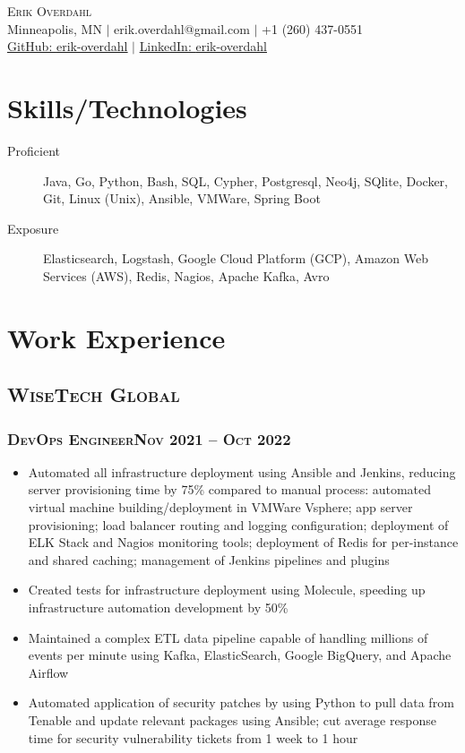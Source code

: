 \documentclass{article}
\newcommand{\resumeSection}[1]{\section*{#1}}
\newcommand{\institution}[1]{\subsection*{\scshape{#1}}}
\newcommand{\jobPosition}[3]{\subsubsection*{\scshape{#1}\hfill #2 -- #3}}
\begin{document}
\begin{center}
  {\Huge\scshape{Erik Overdahl}}
  \\\vspace{5pt}
  \normalsize{
    Minneapolis, MN
    $|$
    erik.overdahl@gmail.com
    $|$
    +1 (260) 437-0551
    \\
    \href{https://github.com/erik-overdahl}{GitHub: \underline{erik-overdahl}}
    $|$
    \href{https://linkedin.com/in/erik-overdahl}{LinkedIn: \underline{erik-overdahl}}
  }
\end{center}

\resumeSection{Skills/Technologies}
  \begin{description}
      \item [Proficient]
          Java,
          Go,
          Python,
          Bash,
          SQL,
          Cypher,
          Postgresql,
          Neo4j,
          SQlite,
          Docker,
          Git,
          Linux (Unix),
          Ansible,
          VMWare,
          Spring Boot

      \item [Exposure]
          Elasticsearch,
          Logstash,
          Google Cloud Platform (GCP),
          Amazon Web Services (AWS),
          Redis,
          Nagios,
          Apache Kafka,
          Avro
  \end{description}

\resumeSection{Work Experience}

  \institution{WiseTech Global}

    \jobPosition{DevOps Engineer}{Nov 2021}{Oct 2022}
    \begin{itemize}[noitemsep]
      \item
            Automated all infrastructure deployment using Ansible and
            Jenkins, reducing server provisioning time by 75\% compared to manual
            process: automated virtual machine building/deployment in VMWare
            Vsphere; app server provisioning; load balancer routing and logging
            configuration; deployment of ELK Stack and Nagios monitoring tools;
            deployment of Redis for per-instance and shared caching; management of
            Jenkins pipelines and plugins
      \item
            Created tests for infrastructure deployment using Molecule,
            speeding up infrastructure automation development by 50\%
      \item
            Maintained a complex ETL data pipeline capable of handling
            millions of events per minute using Kafka, ElasticSearch, Google BigQuery,
            and Apache Airflow
      \item
            Automated application of security patches by using Python to
            pull data from Tenable and update relevant packages using Ansible; cut
            average response time for security vulnerability tickets from 1 week to
            1 hour
    \end{itemize}
\end{document}
